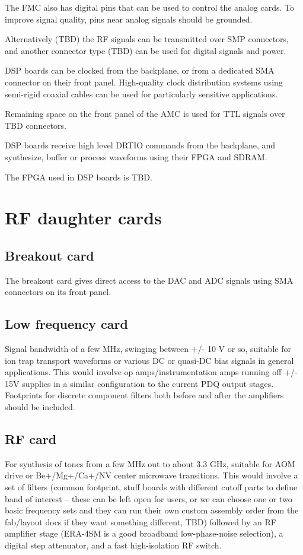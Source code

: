 \documentclass[11pt]{paper}
\begin{document}
The FMC also has digital pins that can be used to control the analog cards. To improve signal quality, pins near analog signals should be grounded.

Alternatively (TBD) the RF signals can be transmitted over SMP connectors, and another connector type (TBD) can be used for digital signals and power.

DSP boards can be clocked from the backplane, or from a dedicated SMA connector on their front panel. High-quality clock distribution systems using semi-rigid coaxial cables can be used for particularly sensitive applications.

Remaining space on the front panel of the AMC is used for TTL signals over TBD connectors.

DSP boards receive high level DRTIO commands from the backplane, and synthesize, buffer or process waveforms using their FPGA and SDRAM.

The FPGA used in DSP boards is TBD.

\section{RF daughter cards}
\subsection{Breakout card}
The breakout card gives direct access to the DAC and ADC signals using SMA connectors on its front panel.

\subsection{Low frequency card}
Signal bandwidth of a few MHz, swinging between +/- 10 V or so, suitable for ion trap transport waveforms or various DC or quasi-DC bias signals in general applications. This would involve op amps/instrumentation amps running off +/- 15V supplies in a similar configuration to the current PDQ output stages. Footprints for discrete component filters both before and after the amplifiers should be included.

\subsection{RF card}
For synthesis of tones from a few MHz out to about 3.3 GHz, suitable for AOM drive or Be+/Mg+/Ca+/NV center microwave transitions. This would involve a set of filters (common footprint, stuff boards with different cutoff parts to define band of interest -- these can be left open for users, or we can choose one or two basic frequency sets and they can run their own custom assembly order from the fab/layout docs if they want something different, TBD) followed by an RF amplifier stage (ERA-4SM is a good broadband low-phase-noise selection), a digital step attenuator, and a fast high-isolation RF switch.
\end{document}
